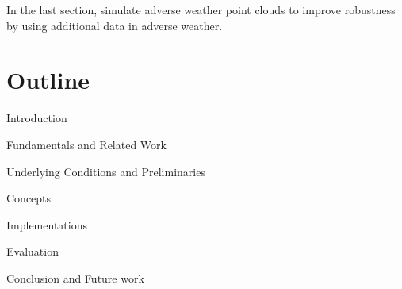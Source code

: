 In the last section, simulate adverse weather point clouds to improve robustness by using additional data in adverse weather.


\section{Outline}
Introduction

Fundamentals and Related Work

Underlying Conditions and Preliminaries

Concepts

Implementations

Evaluation

Conclusion and Future work


